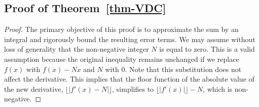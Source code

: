 \documentclass[11pt,letterpaper,oneside,reqno]{amsart}
\renewcommand{\^}[1]{\widehat{#1}}
\numberwithin{equation}{section}
\theoremstyle{remark}
\newcommand*{\thmref}[1]{Theorem~\ref{#1}}
\begin{document}
\subsection{Proof of \thmref{thm-VDC}}\label{Section-Proof-Theorem-Bestimate}
\begin{proof} 
The primary objective of this proof is to approximate the sum by an integral and rigorously bound the resulting error terms. 
%
We may assume without loss of generality that the non-negative integer $N$ is equal to zero. This is a valid assumption because the original inequality remains unchanged if we replace $f(x)$ with $f(x)-Nx$ and $N$ with $0$. Note that this substitution does not affect the derivative. This implies that the floor function of the absolute value of the new derivative, $\lfloor |f'(x)-N| \rfloor$, simplifies to $\lfloor |f'(x)| \rfloor-N$, which is non-negative.


\end{proof}
\end{document}
